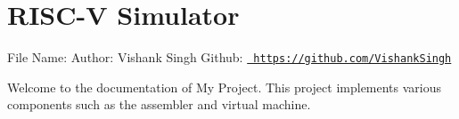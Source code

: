 \chapter{RISC-\/V Simulator}
\hypertarget{index}{}\label{index}
File Name\+:  Author\+: Vishank Singh Github\+: \href{https://github.com/VishankSingh}{\texttt{ https\+://github.\+com/\+Vishank\+Singh}}

Welcome to the documentation of My Project. This project implements various components such as the assembler and virtual machine. 